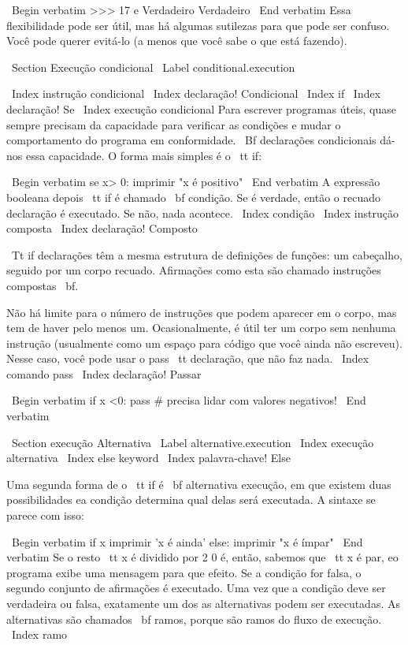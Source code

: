\documentclass[10pt]{book}
\begin{document}
\begin {itemize}
{{\ Begin {verbatim}
>>> 17 e Verdadeiro
Verdadeiro
\ End {verbatim}
%
Essa flexibilidade pode ser útil, mas há algumas sutilezas para
que pode ser confuso. Você pode querer evitá-lo (a menos que
você sabe o que está fazendo).


\ Section {Execução condicional}
\ Label {} conditional.execution

\ Index {instrução condicional}
\ Index {declaração! Condicional}
\ Index {if}
\ Index {declaração! Se}
\ Index {} execução condicional
Para escrever programas úteis, quase sempre precisam da capacidade
para verificar as condições e mudar o comportamento do programa
em conformidade. {\ Bf declarações condicionais} dá-nos essa capacidade. O
forma mais simples é o {\ tt if}:

\ Begin {verbatim}
se x> 0:
    imprimir "x é positivo"
\ End {verbatim}
%
A expressão booleana depois {\ tt if} é
chamado {\ bf condição}. Se é verdade, então o recuado
declaração é executado. Se não, nada acontece.
\ Index {condição}
\ Index {instrução composta}
\ Index {declaração! Composto}

{\ Tt if} declarações têm a mesma estrutura de definições de funções:
um cabeçalho, seguido por um corpo recuado. Afirmações como esta são
chamado {instruções compostas \ bf}.

Não há limite para o número de instruções que podem aparecer em
o corpo, mas tem de haver pelo menos um.
Ocasionalmente, é útil ter um corpo sem nenhuma instrução (usualmente
como um espaço para código que você ainda não escreveu). Nesse
caso, você pode usar o {pass \ tt} declaração, que não faz nada.
\ Index {comando pass}
\ Index {declaração! Passar}

\ Begin {verbatim}
if x <0:
    pass # precisa lidar com valores negativos!
\ End {verbatim}
%

\ Section {execução Alternativa}
\ Label {} alternative.execution
\ Index {execução alternativa}
\ Index {else keyword}
\ Index {palavra-chave! Else}

Uma segunda forma de o {\ tt if} é {\ bf alternativa execução},
em que existem duas possibilidades ea condição determina
qual delas será executada. A sintaxe se parece com isso:

\ Begin {verbatim}
if x%
    imprimir 'x é ainda'
else:
    imprimir "x é ímpar"
\ End {verbatim}
%
Se o resto {\ tt x} é dividido por 2 0 é, então,
sabemos que {\ tt x} é par, eo programa exibe uma mensagem para que
efeito. Se a condição for falsa, o segundo conjunto de afirmações é
executado. Uma vez que a condição deve ser verdadeira ou falsa, exatamente um dos
as alternativas podem ser executadas. As alternativas são chamados
{\ bf ramos}, porque são ramos do fluxo de execução.
\ Index {ramo}



}}
\end{itemize}
\end{document}
